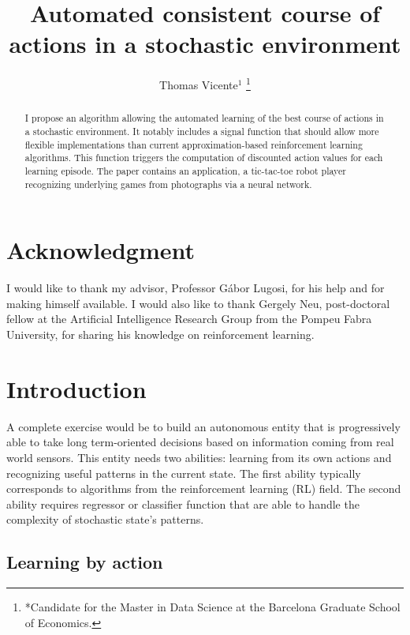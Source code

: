 \documentclass[letterpaper, 10.5 pt, conference]{ieeeconf}
\title{\LARGE \bf
Automated consistent course of actions in a stochastic environment
}
\author{Thomas Vicente$^{1}$%
\thanks{*Candidate for the Master in Data Science at the Barcelona Graduate School of Economics.}%
}
\begin{document}
\maketitle
\thispagestyle{empty}
\pagestyle{empty}

\begin{abstract}

I propose an algorithm allowing the automated learning of the best course of actions in a stochastic environment. It notably includes a signal function that should allow more flexible implementations than current approximation-based reinforcement learning algorithms. This function triggers the computation of discounted action values for each learning episode. The paper contains an application, a tic-tac-toe robot player recognizing underlying games from photographs via a neural network.

\end{abstract}

\section*{Acknowledgment}

I would like to thank my advisor, Professor Gábor Lugosi, for his help and for making himself available. I would also like to thank Gergely Neu, post-doctoral fellow at the Artificial Intelligence Research Group from the Pompeu Fabra University, for sharing his knowledge on reinforcement learning.

\section{Introduction}

A complete exercise would be to build an autonomous entity that is progressively able to take long term-oriented decisions based on information coming from real world sensors. This entity needs two abilities: learning from its own actions and recognizing useful patterns in the current state. The first ability typically corresponds to algorithms from the reinforcement learning (RL) field. The second ability requires regressor or classifier function that are able to handle the complexity of stochastic state's patterns. 

\subsection{Learning by action}
\end{document}
